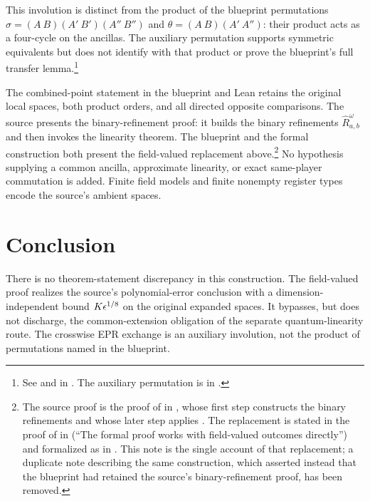 \documentclass[11pt]{article}
\begin{document}
This involution is distinct from the product of the blueprint permutations
$\sigma=(A\ B)(A'\ B')(A''\ B'')$ and
$\theta=(A\ B)(A'\ A'')$: their product acts as a four-cycle on the
ancillas.  The auxiliary permutation supports symmetric equivalents but
does not identify with that product or prove the blueprint's full transfer
lemma.\footnote{See  and
 in
.
The auxiliary permutation is  in
.}

The combined-point statement in the blueprint and Lean retains the original
local spaces, both product orders, and all directed opposite comparisons.
The source presents the binary-refinement proof: it builds the binary
refinements $\hat R^\omega_{a,b}$ and then invokes the linearity theorem.
The blueprint and the formal construction both present the field-valued
replacement above.\footnote{The source proof is the proof of
 in
,
whose first step constructs the binary refinements and whose later step
applies .  The replacement is stated in the proof of
 in
(``The formal proof works with field-valued outcomes directly'') and
formalized as  in
.  This note is the single account
of that replacement; a duplicate note describing the same construction, which
asserted instead that the blueprint had retained the source's
binary-refinement proof, has been removed.}
No hypothesis supplying a common ancilla, approximate linearity, or exact
same-player commutation is added.  Finite field models and finite nonempty
register types encode the source's ambient spaces.

\section{Conclusion}

There is no theorem-statement discrepancy in this construction.  The
field-valued proof realizes the source's polynomial-error conclusion with a
dimension-independent bound $K\epsilon^{1/8}$ on the original expanded spaces.
It bypasses, but does not discharge, the common-extension obligation of the
separate quantum-linearity route.  The crosswise EPR exchange is an auxiliary
involution, not the product of permutations named in the blueprint.



\end{document}
